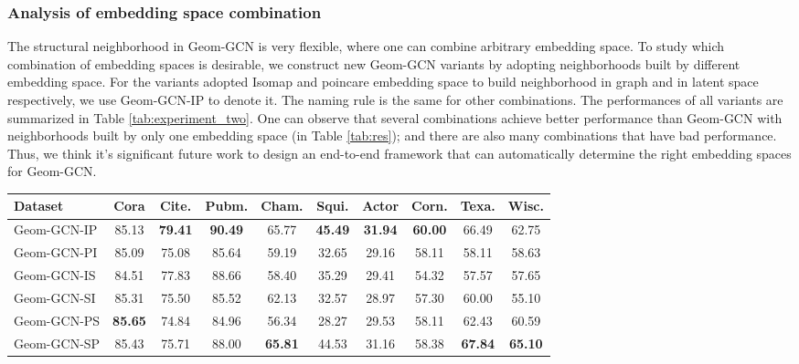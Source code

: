 \documentclass{article} \usepackage{iclr2020_conference,times}
\begin{document}
\subsubsection{Analysis of embedding space combination}
The structural neighborhood in Geom-GCN is very flexible, where one can combine arbitrary embedding space.
To study which combination of embedding spaces is desirable, we construct new Geom-GCN variants by adopting neighborhoods built by different embedding space. 
For the variants adopted Isomap and poincare embedding space to build neighborhood in graph and in latent space respectively,  we use Geom-GCN-IP to denote it. 
The naming rule is the same for other combinations. 
The performances of all variants are summarized in Table \ref{tab:experiment_two}.
One can observe that several combinations achieve better performance than Geom-GCN with neighborhoods built by only one embedding space (in Table \ref{tab:res}); and there are also many combinations that have bad performance. 
Thus, we think it's significant future work to design an end-to-end framework that can automatically determine the right embedding spaces for Geom-GCN.

\begin{table*}[!hbtp]
    \vspace{-1mm}
	\centering
	\caption{Mean Classification Accuracy (Percent)}
	\vspace{-1mm}
	\label{tab:experiment_two}
	\begin{tabular}{lccccccccc}
		\toprule
		\multicolumn{1}{l}{\textbf{Dataset}} &Cora &Cite. &Pubm. &Cham. &Squi. &Actor &Corn. &Texa. &Wisc. \\
		\midrule
		Geom-GCN-IP &85.13 &\textbf{79.41} &\textbf{90.49} &65.77 &\textbf{45.49} &\textbf{31.94} &\textbf{60.00} &66.49 &62.75 \\
		Geom-GCN-PI &85.09 &75.08 &85.64  &59.19 &32.65  &29.16 &58.11 &58.11 &58.63 \\
  		Geom-GCN-IS &84.51 &77.83 &88.66 &58.40 &35.29 &29.41 &54.32 &57.57 &57.65 \\
  		Geom-GCN-SI &85.31 &75.50 &85.52 &62.13 &32.57 &28.97 &57.30 &60.00 &55.10 \\
		Geom-GCN-PS &\textbf{85.65} &74.84 &84.96 &56.34 &28.27 &29.53 &58.11 &62.43 &60.59 \\
		Geom-GCN-SP &85.43 &75.71 &88.00 &\textbf{65.81} &44.53 &31.16 &58.38 &\textbf{67.84} &\textbf{65.10} \\
		\bottomrule
	\end{tabular}
	\vspace{-1mm}
\end{table*}
\end{document}
